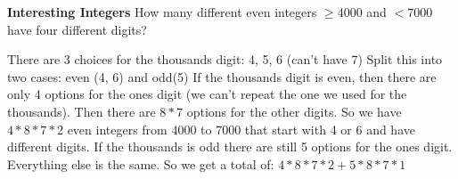 \question \textbf{Interesting Integers}\newline 
How many different even integers $\geq 4000$ and $< 7000$ have four different digits? 
\begin{solution}
There are 3 choices for the thousands digit: 4, 5, 6 (can’t have 7)\newline
Split this into two cases: even (4, 6) and odd(5)\newline
If the thousands digit is even, then there are only 4 options for the ones digit (we can’t repeat the one we used for the thousands). Then there are $8*7$ options for the other digits. So we have $4*8*7*2$ even integers from 4000 to 7000 that start with 4 or 6 and have different digits.\newline
If the thousands is odd there are still 5 options for the ones digit. Everything else is the same.
So we get a total of: $4*8*7*2 + 5*8*7*1$

\end{solution}